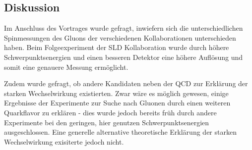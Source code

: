 \subsection{Diskussion}
Im Anschluss des Vortrages wurde gefragt, inwiefern sich die unterschiedlichen Spinmessungen des Gluons der verschiedenen Kollaborationen unterschieden haben.
Beim Folgeexperiment der SLD Kollaboration wurde durch höhere Schwerpunktsenergien und einen besseren Detektor eine höhere Auflösung und somit eine genauere Messung ermöglicht.

Zudem wurde gefragt, ob andere Kandidaten neben der QCD zur Erklärung der starken Wechselwirkung existierten.
Zwar wäre es möglich gewesen, einige Ergebnisse der Experimente zur Suche nach Gluonen durch einen weiteren Quarkflavor zu erklären - dies wurde jedoch bereits früh durch andere Experimente bei den geringen, hier genutzen Schwerpunktsenergien ausgeschlossen.
Eine generelle alternative theoretische Erklärung der starken Wechselwirkung exisiterte jedoch nicht.